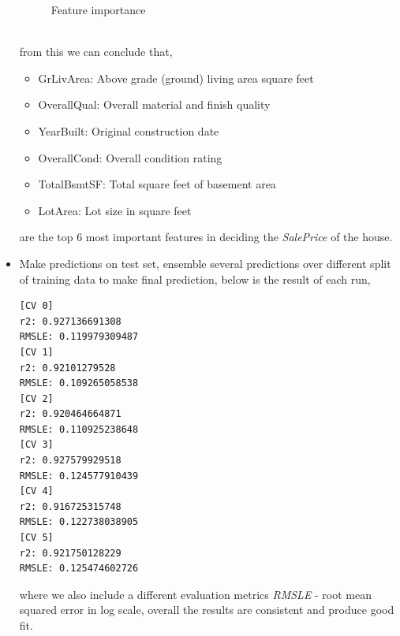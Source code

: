 \documentclass[12pt]{article}
\begin{document}
\begin{itemize}
\begin{figure}[h!]
	\caption{Feature importance}
	\label{fig:6}
\end{figure}
\\
from this we can conclude that, 
\begin{itemize}
\item GrLivArea: Above grade (ground) living area square feet
\item OverallQual: Overall material and finish quality
\item YearBuilt: Original construction date
\item OverallCond: Overall condition rating
\item TotalBsmtSF: Total square feet of basement area
\item LotArea: Lot size in square feet
\end{itemize}
are the top 6 most important features in deciding the \textit{SalePrice} of the house.
\item Make predictions on test set, ensemble several predictions over different split of training data to make final prediction, below is the result of each run,
\begin{verbatim}
[CV 0]
r2: 0.927136691308
RMSLE: 0.119979309487
[CV 1]
r2: 0.92101279528
RMSLE: 0.109265058538
[CV 2]
r2: 0.920464664871
RMSLE: 0.110925238648
[CV 3]
r2: 0.927579929518
RMSLE: 0.124577910439
[CV 4]
r2: 0.916725315748
RMSLE: 0.122738038905
[CV 5]
r2: 0.921750128229
RMSLE: 0.125474602726
\end{verbatim}
where we also include a different evaluation metrics \textit{RMSLE} - root mean squared error in log scale, overall the results are consistent and produce good fit. 
\end{itemize}
\end{document}
